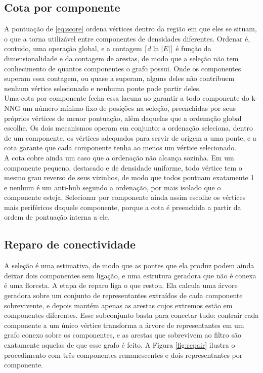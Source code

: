 \subsection{Cota por componente\label{sec:quota}}

A pontuação de \eqref{eq:score} ordena vértices dentro da região em que eles se situam, o que a torna utilizável entre componentes de densidades diferentes. Ordenar é, contudo, uma operação global, e a contagem $\lceil d \ln |E| \rceil$ é função da dimensionalidade e da contagem de arestas, de modo que a seleção não tem conhecimento de quantos componentes o grafo possui. Onde os componentes superam essa contagem, ou quase a superam, alguns deles não contribuem nenhum vértice selecionado e nenhuma ponte pode partir deles.\\

Uma cota por componente fecha essa lacuna ao garantir a todo componente do \ac{k-NNG} um número mínimo fixo de posições na seleção, preenchidas por seus próprios vértices de menor pontuação, além daquelas que a ordenação global escolhe. Os dois mecanismos operam em conjunto: a ordenação seleciona, dentro de um componente, os vértices adequados para servir de origem a uma ponte, e a cota garante que cada componente tenha ao menos um vértice selecionado.\\

A cota cobre ainda um caso que a ordenação não alcança sozinha. Em um componente pequeno, destacado e de densidade uniforme, todo vértice tem o mesmo grau reverso de seus vizinhos, de modo que todos pontuam exatamente 1 e nenhum é um anti-hub segundo a ordenação, por mais isolado que o componente esteja. Selecionar por componente ainda assim escolhe os vértices mais periféricos daquele componente, porque a cota é preenchida a partir da ordem de pontuação interna a ele.\\

\subsection{Reparo de conectividade\label{sec:repair}}

A seleção é uma estimativa, de modo que as pontes que ela produz podem ainda deixar dois componentes sem ligação, e uma estrutura geradora que não é conexa é uma floresta. A etapa de reparo liga o que restou. Ela calcula uma árvore geradora sobre um conjunto de representantes extraídos de cada componente sobrevivente, e depois mantém apenas as arestas cujos extremos estão em componentes diferentes. Esse subconjunto basta para conectar tudo: contrair cada componente a um único vértice transforma a árvore de representantes em um grafo conexo sobre os componentes, e as arestas que sobrevivem ao filtro são exatamente aquelas de que esse grafo é feito. A Figura \ref{fig:repair} ilustra o procedimento com três componentes remanescentes e dois representantes por componente.\\


